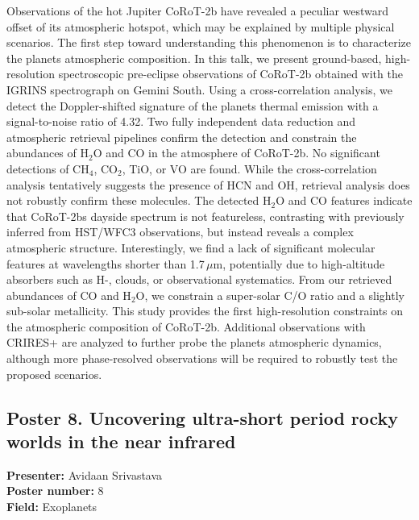 Observations of the hot Jupiter CoRoT-2b have revealed a peculiar westward offset of its atmospheric hotspot, which may be explained by multiple physical scenarios. The first step toward understanding this phenomenon is to characterize the planets atmospheric composition. In this talk, we present ground-based, high-resolution spectroscopic pre-eclipse observations of CoRoT-2b obtained with the IGRINS spectrograph on Gemini South. Using a cross-correlation analysis, we detect the Doppler-shifted signature of the planets thermal emission with a signal-to-noise ratio of 4.32. Two fully independent data reduction and atmospheric retrieval pipelines confirm the detection and constrain the abundances of H$_2$O and CO in the atmosphere of CoRoT-2b. No significant detections of CH$_4$, CO$_2$, TiO, or VO are found. While the cross-correlation analysis tentatively suggests the presence of HCN and OH, retrieval analysis does not robustly confirm these molecules. The detected H$_2$O and CO features indicate that CoRoT-2bs dayside spectrum is not featureless, contrasting with previously inferred from HST/WFC3 observations, but instead reveals a complex atmospheric structure. Interestingly, we find a lack of significant molecular features at wavelengths shorter than 1.7\,$\mu$m, potentially due to high-altitude absorbers such as H-, clouds, or observational systematics. From our retrieved abundances of CO and H$_2$O, we constrain a super-solar C/O ratio and a slightly sub-solar metallicity. This study provides the first high-resolution constraints on the atmospheric composition of CoRoT-2b. Additional observations with CRIRES+ are analyzed to further probe the planets atmospheric dynamics, although more phase-resolved observations will be required to robustly test the proposed scenarios.

\hypertarget{poster-abstract-talk-46}{}\label{poster-abstract-page-talk-46}
\subsection*{Poster 8. Uncovering ultra-short period rocky worlds in the near infrared}
\textbf{Presenter:} Avidaan Srivastava\\
\textbf{Poster number:} 8\\
\textbf{Field:} Exoplanets

